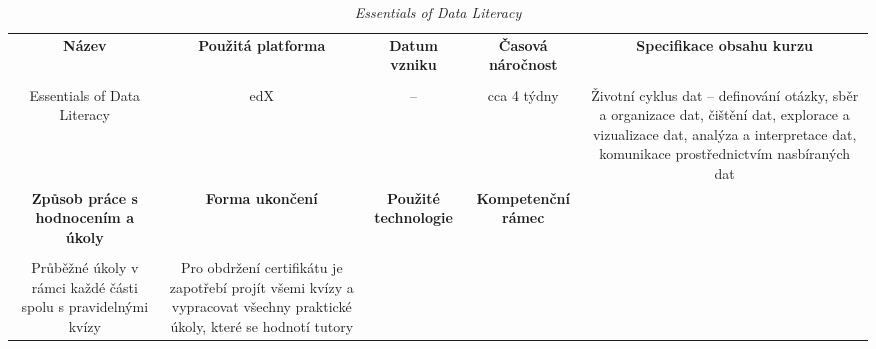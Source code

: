 \begin{landscape}

\begin{table}[htbp]

\renewcommand\thetable{4}

\caption{\textit{Essentials of Data Literacy}}\label{tab4}

\footnotesize

{

\justifying

\begin{tabularx}{\linewidth}{CCCCC}

\toprule

\textbf{Název} &

\textbf{Použitá platforma} &

\textbf{Datum vzniku} &

\textbf{Časová náročnost} &
 
\textbf{Specifikace obsahu kurzu}

\\

\tabularnewline
\midrule

Essentials of Data Literacy

&

edX

&

–

&

cca 4 týdny

&

Životní cyklus dat – definování otázky, sběr a organizace dat, čištění dat, explorace a vizualizace dat, analýza a interpretace dat, komunikace prostřednictvím nasbíraných dat

\\
\toprule

\textbf{Způsob práce s hodnocením a úkoly} &

\textbf{Forma ukončení} &

\textbf{Použité technologie} &

\textbf{Kompetenční rámec} 

\\

\tabularnewline
\midrule

Průběžné úkoly v rámci každé části spolu s pravidelnými kvízy

&

Pro obdržení certifikátu je zapotřebí projít všemi kvízy a vypracovat všechny praktické úkoly, které se hodnotí tutory


\end{tabularx}}
\end{table}
\end{landscape}
